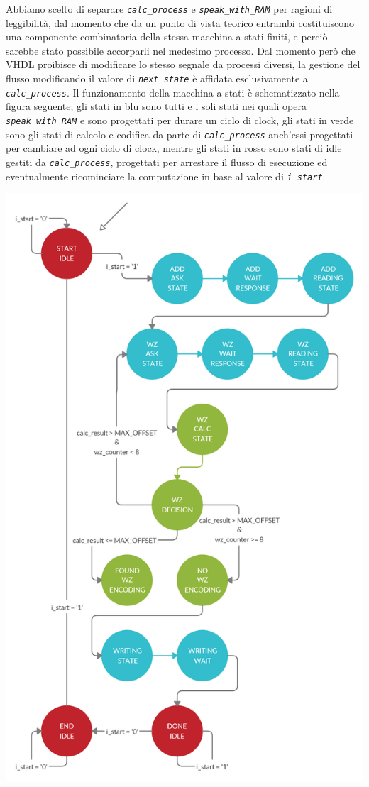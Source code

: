 \documentclass[12pt,a4paper,titlepage]{article}
\begin{document}
		Abbiamo scelto di separare \textit{\texttt{calc\_process}} e \textit{\texttt{speak\_with\_RAM}} per ragioni di leggibilità, dal momento che da un punto di vista teorico entrambi costituiscono una componente combinatoria della stessa macchina a stati finiti, e perciò sarebbe stato possibile accorparli nel medesimo processo. Dal momento però che VHDL proibisce di modificare lo stesso segnale da processi diversi, la gestione del flusso modificando il valore di \textit{\texttt{next\_state}} è affidata esclusivamente a \textit{\texttt{calc\_process}}.
		\newline
		\newline
		Il funzionamento della macchina a stati è schematizzato nella figura seguente; gli stati in blu sono tutti e i soli stati nei quali opera \textit{\texttt{speak\_with\_RAM}} e sono progettati per durare un ciclo di clock, gli stati in verde sono gli stati di calcolo e codifica da parte di \textit{\texttt{calc\_process}} anch'essi progettati per cambiare ad ogni ciclo di clock, mentre gli stati in rosso sono stati di idle gestiti da \textit{\texttt{calc\_process}}, progettati per arrestare il flusso di esecuzione ed eventualmente ricominciare la computazione in base al valore di \textit{\texttt{i\_start}}.

		\includegraphics[scale=0.275]{retlog_FSM_v1_2.png}
\end{document}
